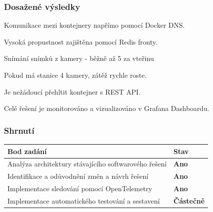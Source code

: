 \documentclass[FM]{tulpresentation}
\begin{document}
\begin{frame}
	\frametitle{Dosažené výsledky}
	\begin{items}
		\item Komunikace mezi kontejnery napřímo pomocí Docker DNS.
		\item Vysoká propustnost zajištěna pomocí Redis fronty.
		\begin{subitems}
			\item Snímání snímků z kamery - běžně až 5 za vteřinu
			\item Pokud má stanice 4 kamery, zátěž rychle roste.
			\item Je nežádoucí přehltit kontejner s REST API.
		\end{subitems}
		\item Celé řešení je monitorováno a vizualizováno v Grafana Dashboardu.
	\end{items}
\end{frame}

\begin{frame}
	\frametitle{Shrnutí}
	\begin{table}[H]
		\centering
		\renewcommand{\arraystretch}{1.5}
		\begin{tabularx}{\textwidth}{|X|l|}
			\hline
			\textbf{Bod zadání} & \textbf{Stav}\\\hline
			Analýza architektury stávajícího softwarového řešení & \textbf{\textcolor{Success}{Ano}} \\\hline
			Identifikace a odůvodnění změn a návrh řešení & \textbf{\textcolor{Success}{Ano}} \\\hline
			Implementace sledování pomocí OpenTelemetry & \textbf{\textcolor{Success}{Ano}} \\\hline
			Implementace automatického testování a sestavení & \textbf{\textcolor{Warning}{Částečně}} \\\hline 
		\end{tabularx}
	\end{table}
\end{frame}
\TULendframe
\end{document}

